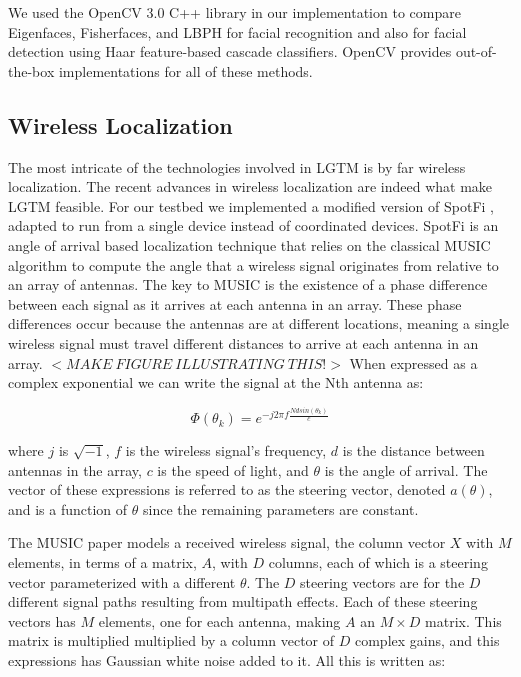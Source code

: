 \documentclass[12pt]{report}
\begin{document}
We used the OpenCV 3.0 \cite{OpenCV} C++ library in our implementation to compare Eigenfaces, Fisherfaces, and LBPH for facial recognition and also for facial detection using Haar feature-based cascade classifiers. OpenCV provides out-of-the-box implementations for all of these methods. \par

\subsection{Wireless Localization}
The most intricate of the technologies involved in LGTM is by far wireless localization. The recent advances in wireless localization \cite{UbicarseKumar2014,SpotFiKotaru2015,ChronosSingleAPLocalizationVasisht2016} are indeed what make LGTM feasible. For our testbed we implemented a modified version of SpotFi \cite{SpotFiKotaru2015}, adapted to run from a single device instead of coordinated devices. SpotFi is an angle of arrival based localization technique that relies on the classical MUSIC algorithm \cite{MUSICSchmidt1986} to compute the angle that a wireless signal originates from relative to an array of antennas. The key to MUSIC is the existence of a phase difference between each signal as it arrives at each antenna in an array. These phase differences occur because the antennas are at different locations, meaning a single wireless signal must travel different distances to arrive at each antenna in an array. $<MAKE \: FIGURE \: ILLUSTRATING \: THIS!>$  When expressed as a complex exponential we can write the signal at the Nth antenna as:

$$\Phi(\theta_{k}) = e^{-j 2 \pi f \frac{N d sin(\theta_{k})}{c}}$$

where $j$ is $\sqrt{-1}$, $f$ is the wireless signal's frequency, $d$ is the distance between antennas in the array, $c$ is the speed of light, and $\theta$ is the angle of arrival. The vector of these expressions is referred to as the steering vector, denoted $a(\theta)$, and is a function of $\theta$ since the remaining parameters are constant. 

The MUSIC paper models a received wireless signal, the column vector $X$ with $M$ elements, in terms of a matrix, $A$, with $D$ columns, each of which is a steering vector parameterized with a different $\theta$. The $D$ steering vectors are for the $D$ different signal paths resulting from multipath effects. Each of these steering vectors has $M$ elements, one for each antenna, making $A$ an $M \times D$ matrix. This matrix is multiplied multiplied by a column vector of $D$ complex gains, and this expressions has Gaussian white noise added to it. All this is written as: \\
\end{document}
